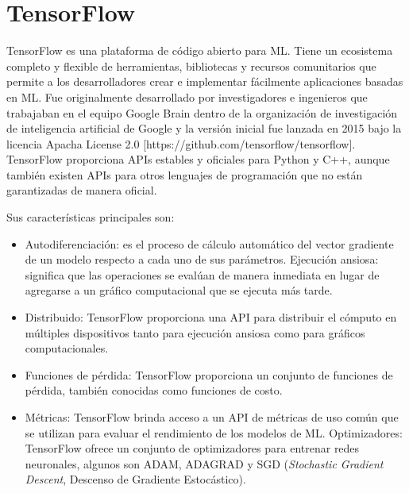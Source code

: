 \section{TensorFlow}
TensorFlow es una plataforma de código abierto para ML. Tiene un ecosistema completo y flexible de herramientas, bibliotecas y recursos comunitarios que permite a los desarrolladores crear e implementar fácilmente aplicaciones basadas en ML. Fue originalmente desarrollado por investigadores e ingenieros que trabajaban en el equipo Google Brain dentro de la organización de investigación de inteligencia artificial de Google y la versión inicial fue lanzada en 2015 bajo la licencia Apacha License 2.0 [https://github.com/tensorflow/tensorflow]. TensorFlow proporciona APIs estables y oficiales para Python y C++, aunque también existen APIs para otros lenguajes de programación que no están garantizadas de manera oficial.

Sus características principales son:
\begin{itemize}
	\item Autodiferenciación: es el proceso de cálculo automático del vector gradiente de un modelo respecto a cada uno de sus parámetros.
	Ejecución ansiosa: significa que las operaciones se evalúan de manera inmediata en lugar de agregarse a un gráfico computacional que se ejecuta más tarde.
	\item Distribuido: TensorFlow proporciona una API para distribuir el cómputo en múltiples dispositivos tanto para ejecución ansiosa como para gráficos computacionales.
	\item Funciones de pérdida: TensorFlow proporciona un conjunto de funciones de pérdida, también conocidas como funciones de costo.
	\item Métricas: TensorFlow brinda acceso a un API de métricas de uso común que se utilizan para evaluar el rendimiento de los modelos de ML.
	Optimizadores: TensorFlow ofrece un conjunto de optimizadores para entrenar redes neuronales, algunos son ADAM, ADAGRAD y SGD (\textit{Stochastic Gradient Descent}, Descenso de Gradiente Estocástico).
\end{itemize}

